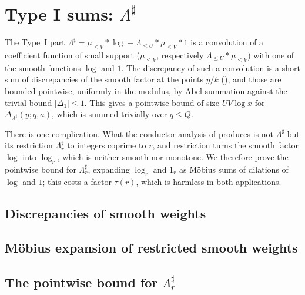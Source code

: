\chapter{Type I sums: \texorpdfstring{$\Lambda^\sharp$}{Lambda sharp}}\label{ch:typeI}

The Type~I part $\Lambda^\sharp = \mu_{\le V} * \log - \Lambda_{\le U} * \mu_{\le V} * 1$ is a convolution of a
coefficient function of small support ($\mu_{\le V}$, respectively $\Lambda_{\le U} * \mu_{\le V}$) with one of
the smooth functions $\log$ and $1$. The discrepancy of such a convolution is a short sum of
discrepancies of the smooth factor at the points $y/k$ (), and those
are bounded pointwise, uniformly in the modulus, by Abel summation against the trivial bound
$|\Delta_1| \le 1$. This gives a pointwise bound of size $UV \log x$ for $\Delta_{\Lambda^\sharp}(y; q, a)$,
which is summed trivially over $q \le Q$.

There is one complication. What the conductor analysis of  produces is not
$\Lambda^\sharp$ but its restriction $\Lambda^\sharp_r$ to integers coprime to $r$, and restriction turns the
smooth factor $\log$ into $\log_r$, which is neither smooth nor monotone. We therefore prove the
pointwise bound for $\Lambda^\sharp_r$, expanding $\log_r$ and $1_r$ as Möbius sums of dilations of
$\log$ and $1$; this costs a factor $\tau(r)$, which is harmless in both applications.

\section{Discrepancies of smooth weights}






\section{Möbius expansion of restricted smooth weights}


\section{The pointwise bound for \texorpdfstring{$\Lambda^\sharp_r$}{Lambda sharp r}}

